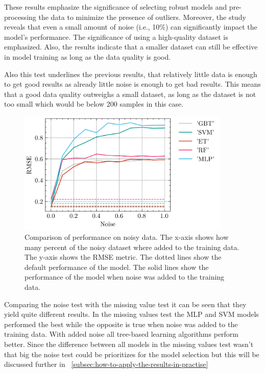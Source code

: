 These results emphasize the significance of selecting robust models and pre-processing the data to minimize the
presence of outliers.
Moreover, the study reveals that even a small amount of noise (i.e., 10\%) can significantly impact the model's
performance.
The significance of using a high-quality dataset is emphasized.
Also, the results indicate that a smaller dataset can still be effective in model training as long as the data
quality is good.

Also this test underlines the previous results, that relatively little data is enough to get good results as already
little noise is enough to get bad results.
This means that a good data quality outweighs a small dataset, as long as the dataset is not too small which would
be below 200 samples in this case.


\begin{figure}[h]
    \begin{tcolorbox}[arc=0pt,boxrule=0.5pt]
        \centering
        \includegraphics[width=0.9\textwidth]{chap5/images/results_noise}
    \end{tcolorbox}
    \caption{Comparison of performance on noisy data.
    The x-axis shows how many percent of the noisy dataset where added to the training data.
    The y-axis shows the RMSE metric.
    The dotted lines show the default performance of the model.
    The solid lines show the performance of the model when noise was added to the training data.
    }
    \label{fig:results-noise-fig}
\end{figure}

Comparing the noise test with the missing value test it can be seen that they yield quite different results.
In the missing values test the \ac{MLP} and \ac{SVM} models performed the best while the opposite is true when noise
was added to the training data.
With added noise all tree-based learning algorithms perform better.
Since the difference between all models in the missing values test wasn't that big the noise test could be
prioritizes for the model selection but this will be discussed further in
~\cref{subsec:how-to-apply-the-results-in-practise}


